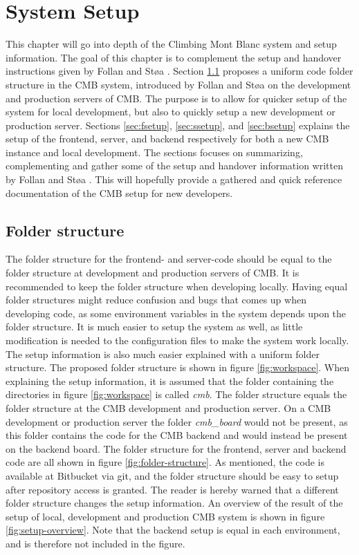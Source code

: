 \chapter{System Setup}
\label{apdx:setup}
This chapter will go into depth of the Climbing Mont Blanc system and setup information. The goal of this chapter is to complement the setup and handover instructions given by Follan and Støa \cite{mt:T&S}. Section \ref{sec:folder} proposes a uniform code folder structure in the CMB system, introduced by Follan and Støa on the development and production servers of CMB. The purpose is to allow for quicker setup of the system for local development, but also to quickly setup a new development or production server. Sections \ref{sec:fsetup}, \ref{sec:ssetup}, and \ref{sec:bsetup} explains the setup of the frontend, server, and backend respectively for both a new CMB instance and local development. The sections focuses on summarizing, complementing and gather some of the setup and handover information written by Follan and Støa \cite{mt:T&S}. This will hopefully provide a gathered and quick reference documentation of the CMB setup for new developers.

\section{Folder structure}
\label{sec:folder}
The folder structure for the frontend- and server-code should be equal to the folder structure at development and production servers of CMB. It is recommended to keep the folder structure when developing locally. Having equal folder structures might reduce confusion and bugs that comes up when developing code, as some environment variables in the system depends upon the folder structure. It is much easier to setup the system as well, as little modification is needed to the configuration files to make the system work locally. The setup information is also much easier explained with a uniform folder structure. The proposed folder structure is shown in figure \ref{fig:workspace}. When explaining the setup information, it is assumed that the folder containing the directories in figure \ref{fig:workspace} is called \textit{cmb}. The folder structure equals the folder structure at the CMB development and production server. On a CMB development or production server the folder \textit{cmb\_board} would not be present, as this folder contains the code for the CMB backend and would instead be present on the backend board. The folder structure for the frontend, server and backend code are all shown in figure \ref{fig:folder-structure}. As mentioned, the code is available at Bitbucket via git, and the folder structure should be easy to setup after repository access is granted. The reader is hereby warned that a different folder structure changes the setup information. An overview of the result of the setup of local, development and production CMB system is shown in figure \ref{fig:setup-overview}. Note that the backend setup is equal in each environment, and is therefore not included in the figure.

